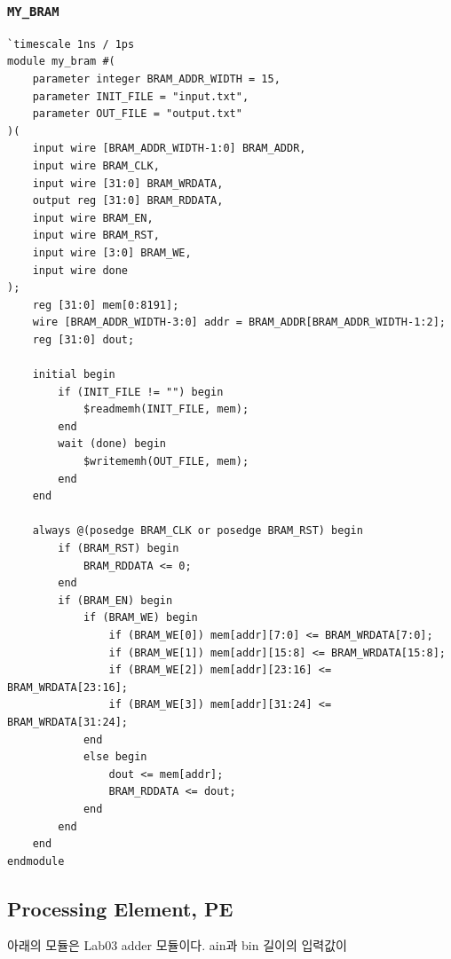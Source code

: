 \documentclass{article}
\begin{document}
\subsubsection*{\texttt{MY\_BRAM}}
\begin{lstlisting}[style={verilog-style}]
`timescale 1ns / 1ps
module my_bram #(
    parameter integer BRAM_ADDR_WIDTH = 15,
    parameter INIT_FILE = "input.txt",
    parameter OUT_FILE = "output.txt"
)(
    input wire [BRAM_ADDR_WIDTH-1:0] BRAM_ADDR,
    input wire BRAM_CLK,
    input wire [31:0] BRAM_WRDATA,
    output reg [31:0] BRAM_RDDATA,
    input wire BRAM_EN,
    input wire BRAM_RST,
    input wire [3:0] BRAM_WE,
    input wire done
);
    reg [31:0] mem[0:8191];
    wire [BRAM_ADDR_WIDTH-3:0] addr = BRAM_ADDR[BRAM_ADDR_WIDTH-1:2];
    reg [31:0] dout;
    
    initial begin
        if (INIT_FILE != "") begin
            $readmemh(INIT_FILE, mem);
        end
        wait (done) begin
            $writememh(OUT_FILE, mem);
        end
    end
    
    always @(posedge BRAM_CLK or posedge BRAM_RST) begin
        if (BRAM_RST) begin 
            BRAM_RDDATA <= 0;
        end
        if (BRAM_EN) begin
            if (BRAM_WE) begin
                if (BRAM_WE[0]) mem[addr][7:0] <= BRAM_WRDATA[7:0];
                if (BRAM_WE[1]) mem[addr][15:8] <= BRAM_WRDATA[15:8];
                if (BRAM_WE[2]) mem[addr][23:16] <= BRAM_WRDATA[23:16];
                if (BRAM_WE[3]) mem[addr][31:24] <= BRAM_WRDATA[31:24]; 
            end
            else begin
                dout <= mem[addr];
                BRAM_RDDATA <= dout;
            end
        end
    end
endmodule
\end{lstlisting}

\newpage
\subsection{Processing Element, PE}

아래의 모듈은 Lab03 adder 모듈이다. ain과 bin 길이의 입력값이 
\end{document}
